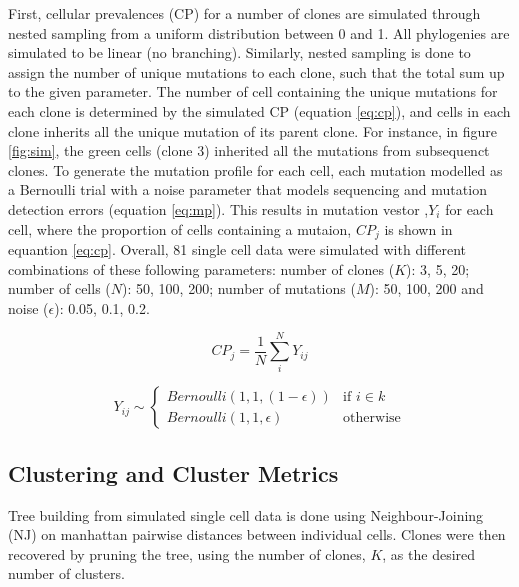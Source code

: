 \documentclass{article}
\begin{document}
First, cellular prevalences (CP) for a number of clones are simulated through nested sampling from a uniform distribution between 0 and 1. All phylogenies are simulated to be linear (no branching). Similarly, nested sampling is done to assign the number of unique mutations to each clone, such that the total sum up to the given parameter. The number of cell containing the unique mutations for each clone is determined by the simulated CP (equation \ref{eq:cp}), and cells in each clone inherits all the unique mutation of its parent clone. For instance, in figure \ref{fig:sim}, the green cells (clone 3) inherited all the mutations from subsequenct clones. To generate the mutation profile for each cell, each mutation modelled as a Bernoulli trial with a noise parameter that models sequencing and mutation detection errors  (equation \ref{eq:mp}). This results in mutation vestor ,$Y_i$ for each cell, where the proportion of cells containing a mutaion, $CP_j$ is shown in equantion \ref{eq:cp}. Overall, 81 single cell data were simulated with different combinations of these following parameters: number of clones ($K$): 3, 5, 20; number of cells ($N$):  50, 100, 200; number of mutations ($M$): 50, 100, 200 and noise ($\epsilon$): 0.05, 0.1, 0.2.

\begin{equation} \label{eq:cp}
    CP_j = \frac{1}{N}  \sum^N_i Y_{ij}
\end{equation}

\begin{equation} \label{eq:mp}
    Y_{ij} \sim \begin{cases}
        Bernoulli(1, 1, (1 - \epsilon)) & \text{if } i \in k \\
        Bernoulli(1, 1, \epsilon) & \text{otherwise}
        \end{cases}
\end{equation}

\subsection{Clustering and Cluster Metrics}
Tree building from simulated single cell data is done using Neighbour-Joining (NJ) on manhattan pairwise distances between individual cells. Clones were then recovered by pruning the tree, using the number of clones, $K$, as the desired number of clusters.
\end{document}
